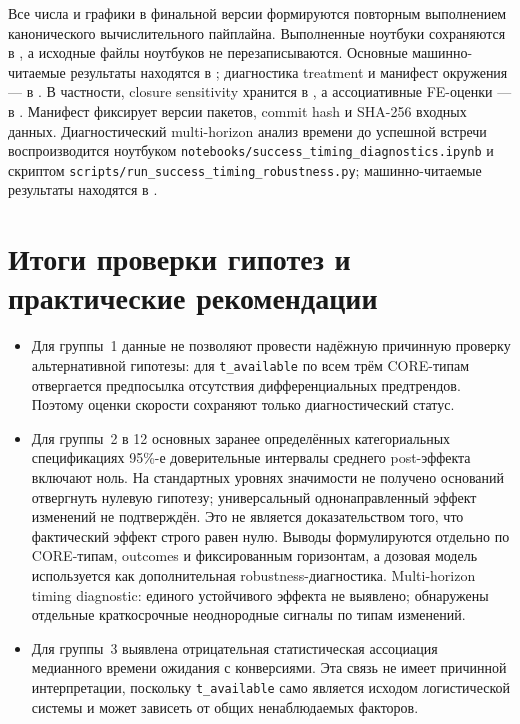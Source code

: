 \documentclass[14pt,a4paper]{extarticle}
\begin{document}
Все числа и графики в финальной версии формируются повторным выполнением
канонического вычислительного пайплайна. Выполненные ноутбуки сохраняются в
, а исходные файлы ноутбуков не перезаписываются.
Основные машинно-читаемые результаты находятся в ;
диагностика treatment и манифест окружения --- в
. В частности, closure sensitivity хранится в
, а ассоциативные FE-оценки ---
в . Манифест фиксирует
версии пакетов, commit hash и SHA-256 входных данных.
Диагностический multi-horizon анализ времени до успешной встречи
воспроизводится ноутбуком \texttt{notebooks/success\_timing\_diagnostics.ipynb}
и скриптом \texttt{scripts/run\_success\_timing\_robustness.py}; машинно-читаемые
результаты находятся в .

\section{Итоги проверки гипотез и практические рекомендации}

\begin{itemize}
    \item Для группы~1 данные не позволяют провести надёжную причинную
    проверку альтернативной гипотезы: для \texttt{t\_available}
    по всем трём CORE-типам отвергается предпосылка отсутствия
    дифференциальных предтрендов. Поэтому оценки скорости сохраняют
    только диагностический статус.

    \item Для группы~2 в 12 основных заранее определённых категориальных
    спецификациях 95\%-е доверительные интервалы среднего post-эффекта
    включают ноль. На стандартных уровнях значимости не получено
    оснований отвергнуть нулевую гипотезу; универсальный
    однонаправленный эффект изменений не подтверждён. Это не является
    доказательством того, что фактический эффект строго равен нулю.
    Выводы формулируются отдельно по CORE-типам, outcomes и фиксированным
    горизонтам, а дозовая модель используется как дополнительная
    robustness-диагностика. Multi-horizon timing diagnostic: единого
    устойчивого эффекта не выявлено; обнаружены отдельные краткосрочные
    неоднородные сигналы по типам изменений.

    \item Для группы~3 выявлена отрицательная статистическая ассоциация
    медианного времени ожидания с конверсиями. Эта связь не имеет
    причинной интерпретации, поскольку \texttt{t\_available} само
    является исходом логистической системы и может зависеть от общих
    ненаблюдаемых факторов.
\end{itemize}
\end{document}
